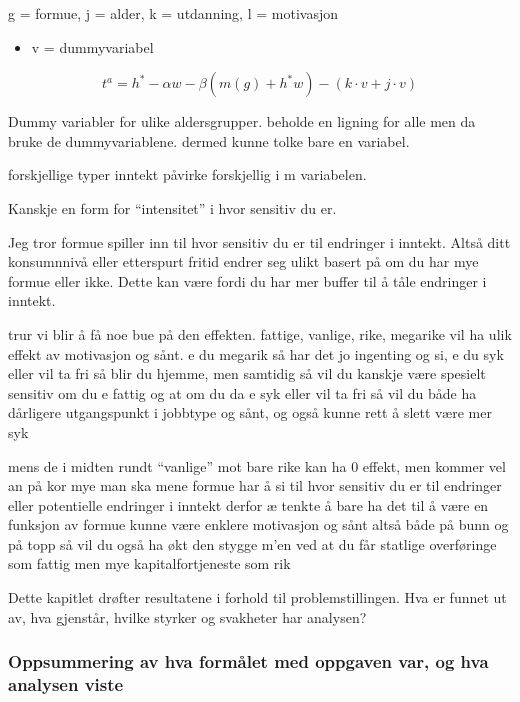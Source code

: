 \documentclass[
  12pt,
  a4paper,
  DIV=11,
  numbers=noendperiod]{scrartcl}
\providecommand{\tightlist}{%
  \setlength{\itemsep}{0pt}\setlength{\parskip}{0pt}}\usepackage{longtable,booktabs,array}
\begin{document}
g = formue, j = alder, k = utdanning, l = motivasjon

\begin{itemize}
\tightlist
\item
  v = dummyvariabel
\end{itemize}

\[
t^a = h^* - \alpha w - \beta(m(g) + h^*w) - (k\cdot v+j\cdot v)
\]

Dummy variabler for ulike aldersgrupper. beholde en ligning for alle men
da bruke de dummyvariablene. dermed kunne tolke bare en variabel.

forskjellige typer inntekt påvirke forskjellig i m variabelen.

Kanskje en form for ``intensitet'' i hvor sensitiv du er.

Jeg tror formue spiller inn til hvor sensitiv du er til endringer i
inntekt. Altså ditt konsumnnivå eller etterspurt fritid endrer seg ulikt
basert på om du har mye formue eller ikke. Dette kan være fordi du har
mer buffer til å tåle endringer i inntekt.

trur vi blir å få noe bue på den effekten. fattige, vanlige, rike,
megarike vil ha ulik effekt av motivasjon og sånt. e du megarik så har
det jo ingenting og si, e du syk eller vil ta fri så blir du hjemme, men
samtidig så vil du kanskje være spesielt sensitiv om du e fattig og at
om du da e syk eller vil ta fri så vil du både ha dårligere utgangspunkt
i jobbtype og sånt, og også kunne rett å slett være mer syk

mens de i midten rundt ``vanlige'' mot bare rike kan ha 0 effekt, men
kommer vel an på kor mye man ska mene formue har å si til hvor sensitiv
du er til endringer eller potentielle endringer i inntekt derfor æ
tenkte å bare ha det til å være en funksjon av formue kunne være enklere
motivasjon og sånt altså både på bunn og på topp så vil du også ha økt
den stygge m'en ved at du får statlige overføringe som fattig men mye
kapitalfortjeneste som rik

Dette kapitlet drøfter resultatene i forhold til problemstillingen. Hva
er funnet ut av, hva gjenstår, hvilke styrker og svakheter har analysen?

\subsubsection{Oppsummering av hva formålet med oppgaven var, og hva
analysen
viste}\label{oppsummering-av-hva-formuxe5let-med-oppgaven-var-og-hva-analysen-viste}
\end{document}
